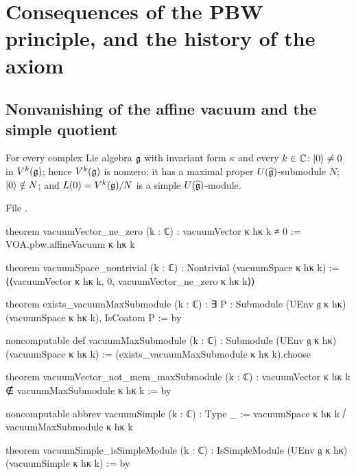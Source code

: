 \section{Consequences of the PBW principle, and the history of the axiom}\label{l02:sec:consequences}

\subsection{Nonvanishing of the affine vacuum and the simple quotient}

\begin{theorem}\label{l02:thm:vacne}
For every complex Lie algebra $\mathfrak{g}$ with invariant form $\kappa$ and every $k\in{\mathbb{C}}$:
$|0\rangle\ne0$ in $V^k(\mathfrak{g})$; hence $V^k(\mathfrak{g})$ is nonzero; it has a maximal proper
$U(\widehat{\mathfrak{g}})$-submodule $N$; $|0\rangle\notin N$; and $L(0) = V^k(\mathfrak{g})/N$ is a simple
$U(\widehat{\mathfrak{g}})$-module.
\end{theorem}

File .
\begin{leancode}
theorem vacuumVector_ne_zero (k : ℂ) : vacuumVector κ hκ k ≠ 0 :=
  VOA.pbw.affineVacuum κ hκ k

theorem vacuumSpace_nontrivial (k : ℂ) : Nontrivial (vacuumSpace κ hκ k) :=
  ⟨⟨vacuumVector κ hκ k, 0, vacuumVector_ne_zero κ hκ k⟩⟩

theorem exists_vacuumMaxSubmodule (k : ℂ) :
    ∃ P : Submodule (UEnv 𝔤 κ hκ) (vacuumSpace κ hκ k), IsCoatom P := by

noncomputable def vacuumMaxSubmodule (k : ℂ) :
    Submodule (UEnv 𝔤 κ hκ) (vacuumSpace κ hκ k) :=
  (exists_vacuumMaxSubmodule κ hκ k).choose

theorem vacuumVector_not_mem_maxSubmodule (k : ℂ) :
    vacuumVector κ hκ k ∉ vacuumMaxSubmodule κ hκ k := by

noncomputable abbrev vacuumSimple (k : ℂ) : Type _ :=
  vacuumSpace κ hκ k ⧸ vacuumMaxSubmodule κ hκ k

theorem vacuumSimple_isSimpleModule (k : ℂ) :
    IsSimpleModule (UEnv 𝔤 κ hκ) (vacuumSimple κ hκ k) := by
\end{leancode}

